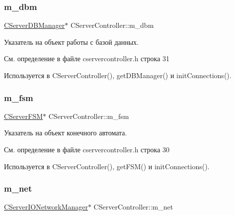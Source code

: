 \subsubsection{\texorpdfstring{m\+\_\+dbm}{m\_dbm}}
{\footnotesize\ttfamily \hyperlink{class_c_server_d_b_manager}{C\+Server\+D\+B\+Manager}$\ast$ C\+Server\+Controller\+::m\+\_\+dbm\hspace{0.3cm}{\ttfamily [private]}}



Указатель на объект работы с базой данных. 



См. определение в файле cservercontroller.\+h строка 31



Используется в C\+Server\+Controller(), get\+D\+B\+Manager() и init\+Connections().

\hypertarget{class_c_server_controller_a3282dabaabac03bdb3447001c186a97f}{}\label{class_c_server_controller_a3282dabaabac03bdb3447001c186a97f} 
\subsubsection{\texorpdfstring{m\+\_\+fsm}{m\_fsm}}
{\footnotesize\ttfamily \hyperlink{class_c_server_f_s_m}{C\+Server\+F\+SM}$\ast$ C\+Server\+Controller\+::m\+\_\+fsm\hspace{0.3cm}{\ttfamily [private]}}



Указатель на объект конечного автомата. 



См. определение в файле cservercontroller.\+h строка 30



Используется в C\+Server\+Controller(), get\+F\+S\+M() и init\+Connections().

\hypertarget{class_c_server_controller_a64ce9925628d153d9576ee4534380dac}{}\label{class_c_server_controller_a64ce9925628d153d9576ee4534380dac} 
\subsubsection{\texorpdfstring{m\+\_\+net}{m\_net}}
{\footnotesize\ttfamily \hyperlink{class_c_server_i_o_network_manager}{C\+Server\+I\+O\+Network\+Manager}$\ast$ C\+Server\+Controller\+::m\+\_\+net\hspace{0.3cm}{\ttfamily [private]}}



